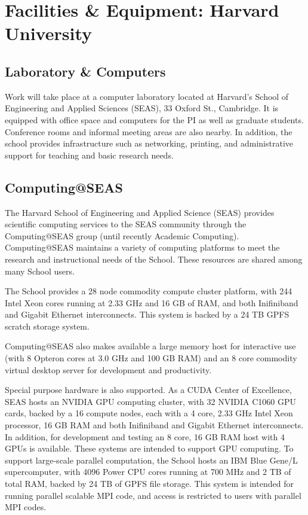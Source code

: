 \documentclass[11pt]{article}
\begin{document}
\setcounter{section}{4}

\section*{Facilities \& Equipment: Harvard University}

\subsection*{Laboratory \& Computers}

Work will take place at a computer laboratory located at Harvard's
School of Engineering and Applied Sciences (SEAS), 33 Oxford St.,
Cambridge. It is equipped with office space and computers for the PI as
well as graduate students. Conference rooms and informal meeting areas
are also nearby. In addition, the school provides infrastructure such as
networking, printing, and administrative support for teaching and basic
research needs.

\subsection*{Computing@SEAS}

The Harvard School of Engineering and Applied Science (SEAS) provides
scientific computing services to the SEAS community through the
Computing@SEAS group (until recently Academic Computing). Computing@SEAS
maintains a variety of computing platforms to meet the research and
instructional needs of the School. These resources are shared among many
School users.

The School provides a 28 node commodity compute cluster platform,
with 244 Intel Xeon cores running at 2.33 GHz and 16 GB of RAM, and both
Inifiniband and Gigabit Ethernet interconnects. This system is backed by
a 24 TB GPFS scratch storage system.

Computing@SEAS also makes available a large memory host for
interactive use (with 8 Opteron cores at 3.0 GHz and 100 GB RAM) and an 8
core commodity virtual desktop server for development and productivity.

Special purpose hardware is also supported.
%
As a CUDA Center of Excellence, SEAS hosts an NVIDIA GPU computing
cluster, with 32 NVIDIA C1060 GPU cards, backed by a 16 compute nodes,
each with a 4 core, 2.33 GHz Intel Xeon processor, 16 GB RAM and both
Inifiniband and Gigabit Ethernet interconnects. In addition, for
development and testing an 8 core, 16 GB RAM host with 4 GPUs is
available. These systems are intended to support GPU computing.
%
To support large-scale parallel computation, the School hosts an IBM
Blue Gene/L supercomputer, with 4096 Power CPU cores running at 700 MHz
and 2 TB of total RAM, backed by 24 TB of GPFS file storage. This system
is intended for running parallel scalable MPI code, and access is
restricted to users with parallel MPI codes.
\end{document}
